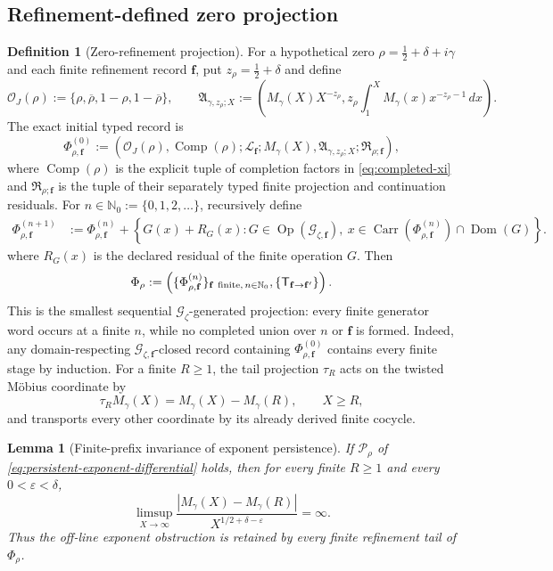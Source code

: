 \documentclass[11pt,a4paper]{article}
\newtheorem{lemma}[theorem]{Lemma}
\theoremstyle{definition}
\newtheorem{definition}[theorem]{Definition}
\newcommand{\Field}{\Phi}
\newcommand{\Gen}{\mathcal{G}}
\newcommand{\Residual}{\mathfrak{R}}
\newcommand{\Dual}{J}
\begin{document}
\subsection{Refinement-defined zero projection}

\begin{definition}[Zero-refinement projection]
\label{def:zero-refinement-projection}
For a hypothetical zero
$\rho=\tfrac12+\delta+i\gamma$ and each finite refinement record $\mathbf f$,
put $z_\rho=\tfrac12+\delta$ and define
\[
  \mathcal O_{\Dual}(\rho)
  :=
  \{\rho,\overline\rho,1-\rho,1-\overline\rho\},
  \qquad
  \mathfrak A_{\gamma,z_\rho;X}
  :=
  \left(
    M_\gamma(X)X^{-z_\rho},
    z_\rho\int_1^X M_\gamma(x)x^{-z_\rho-1}\,dx
  \right).
\]
The exact initial typed record is
\[
  \Field_{\rho,\mathbf f}^{(0)}
  :=
  \left(
    \mathcal O_{\Dual}(\rho),
    \operatorname{Comp}(\rho);
    \mathscr L_{\mathbf f};
    M_\gamma(X),\mathfrak A_{\gamma,z_\rho;X};
    \Residual_{\rho;\mathbf f}
  \right),
\]
where $\operatorname{Comp}(\rho)$ is the explicit tuple of completion factors
in \cref{eq:completed-xi} and $\Residual_{\rho;\mathbf f}$ is the tuple of
their separately typed finite projection and continuation residuals. For
$n\in\mathbb N_0:=\{0,1,2,\ldots\}$, recursively define
\[
\begin{aligned}
  \Field_{\rho,\mathbf f}^{(n+1)}
  &:=
  \Field_{\rho,\mathbf f}^{(n)}
  +
  \left\{
    G(x)+R_G(x):
    G\in\operatorname{Op}(\Gen_{\zeta,\mathbf f}),\
    x\in
    \operatorname{Carr}(\Field_{\rho,\mathbf f}^{(n)})
    \cap\operatorname{Dom}(G)
  \right\}.
\end{aligned}
\]
where $R_G(x)$ is the declared residual of the finite operation $G$. Then
\[
  \Field_\rho
  :=
  \left(
    \{\Field_{\rho,\mathbf f}^{(n)}\}_{\mathbf f\ {\rm finite},\,n\in\mathbb N_0},
    \{\mathsf T_{\mathbf f\to\mathbf f'}\}
  \right).
\]
This is the smallest sequential $\Gen_\zeta$-generated projection: every
finite generator word occurs at a finite $n$, while no completed union over
$n$ or $\mathbf f$ is formed. Indeed, any domain-respecting
$\Gen_{\zeta,\mathbf f}$-closed record containing
$\Field_{\rho,\mathbf f}^{(0)}$ contains every finite stage by induction.
For a finite $R\geq1$, the tail projection $\tau_R$ acts on the twisted
Möbius coordinate by
\[
  \tau_RM_\gamma(X)
  =
  M_\gamma(X)-M_\gamma(R),
  \qquad X\geq R,
\]
and transports every other coordinate by its already derived finite cocycle.
\end{definition}

\begin{lemma}[Finite-prefix invariance of exponent persistence]
\label{lem:riemann-tail-stability}
If $\mathcal P_\rho$ of
\cref{eq:persistent-exponent-differential} holds, then for every finite
$R\geq1$ and every $0<\varepsilon<\delta$,
\begin{equation}
\label{eq:riemann-tail-stability}
  \limsup_{X\to\infty}
  \frac{|M_\gamma(X)-M_\gamma(R)|}
       {X^{1/2+\delta-\varepsilon}}
  =\infty.
\end{equation}
Thus the off-line exponent obstruction is retained by every finite refinement
tail of $\Field_\rho$.
\end{lemma}
\end{document}
